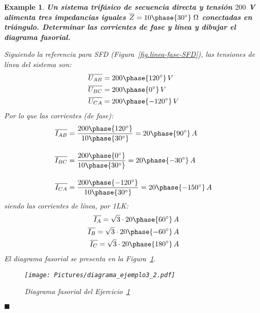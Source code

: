 \documentclass[11pt]{book} %
\numberwithin{dummy}{section}
\theoremstyle{ocrenumbox}
\theoremstyle{blacknumex}
\newtheorem{exampleT}{Example}[chapter]
\theoremstyle{blacknumbox}
\theoremstyle{ocrenum}
\newenvironment{example}{\begin{exampleT}}{\hfill{\tiny\ensuremath{\blacksquare}}\end{exampleT}}
\begin{document}
	\vspace{4mm}
    \begin{example}\label{ej.3-2}
	    \textbf{Un sistema trifásico de secuencia directa y tensión $200$ V alimenta tres impedancias iguales $\overline{Z}=10\phase{30^\circ}\;\Omega$ conectadas en triángulo. Determinar las corrientes de fase y línea y dibujar el diagrama fasorial.}
	    
	    Siguiendo la referencia para SFD (Figura~\ref{fig.linea-fase-SFD}), las tensiones de línea del sistema son:
	    \begin{align*}
	        \overline{U_{AB}}&=200\phase{120^\circ}\,V\\
	        \overline{U_{BC}}&=200\phase{0^\circ}\,V\\
	        \overline{U_{CA}}&=200\phase{-120^\circ}\,V
	    \end{align*}
	    Por lo que las corrientes (de fase):
	    \begin{align*}
	        \overline{I_{AB}} &= \frac{200\phase{120^\circ}}{10\phase{30^\circ}} =20\phase{90^\circ} \,A \\[10pt]
          \overline{I_{BC}} &= \frac{200\phase{0^\circ}}{10\phase{30^\circ}} = 20\phase{-30^\circ} \,A\\[10pt]
          \overline{I_{CA}} &=\frac{200\phase{-120^\circ}}{10\phase{30^\circ}} = 20\phase{-150^\circ} \,A
	    \end{align*}
	    siendo las corrientes de línea, por 1LK:
	    \begin{align*}
	        \overline{I_A}=\sqrt{3}\cdot 20\phase{60^\circ}\,A\\
	        \overline{I_B}=\sqrt{3}\cdot 20\phase{-60^\circ}\,A\\
	        \overline{I_C}=\sqrt{3}\cdot 20\phase{180^\circ}\,A
	    \end{align*}
	    El diagrama fasorial se presenta en la Figura~\ref{fig.diagrama_ejemplo_3-2}. 
	    \begin{figure}[htbp]
	        \centering
	    \texttt{[image: Pictures/diagrama\_ejemplo3\_2.pdf]}
	        \caption{Diagrama fasorial del Ejercicio~\ref{ej.3-2}}
	        \label{fig.diagrama_ejemplo_3-2}
	    \end{figure}
	\end{example}
	
\end{document}
